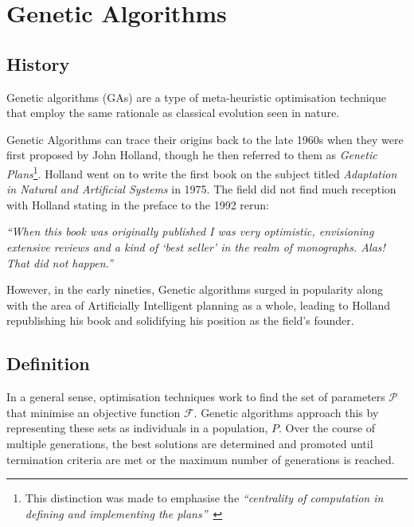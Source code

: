 \section{Genetic Algorithms}

\subsection{History}

Genetic algorithms (GAs) are a type of meta-heuristic optimisation technique that employ the same rationale as classical evolution seen in nature.

Genetic Algorithms can trace their origins back to the late 1960s when they were first proposed by John Holland, though he then referred to them as \textit{Genetic Plans}\footnote{This distinction was made to emphasise the \textit{``centrality of computation in defining and implementing the plans''}~\cite{hollandAdaptationNaturalArtificial1992}}. Holland went on to write the first book on the subject titled \textit{Adaptation in Natural and Artificial Systems}\cite{hollandAdaptationNaturalArtificial1992} in 1975. The field did not find much reception with Holland stating in the preface to the 1992 rerun:

\begin{displayquote}
\textit{``When this book was originally published I was very optimistic, envisioning extensive reviews and a kind of `best seller' in the realm of monographs. Alas! That did not happen.''}
\end{displayquote}

However, in the early nineties, Genetic algorithms surged in popularity along with the area of Artificially Intelligent planning as a whole, leading to Holland republishing his book and solidifying his position as the field's founder.

\subsection{Definition}
In a general sense, optimisation techniques work to find the set of parameters $\mathcal{P}$ that minimise an objective function $\mathcal{F}$. 
Genetic algorithms approach this by representing these sets as individuals in a population, $P$. Over the course of multiple generations, the best solutions are determined and promoted until termination criteria are met or the maximum number of generations is reached.

